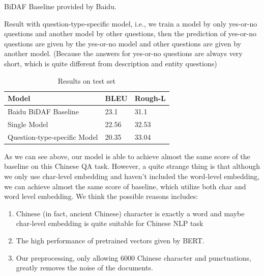\documentclass{article}
\begin{document}
BiDAF Baseline provided by Baidu.\citet{DBLP:journals/corr/abs-1711-05073}

Result with question-type-specific model, i.e., we train a model by only yes-or-no questions and another model by other questions, then the prediction of yes-or-no questions are given by the yes-or-no model and other questions are given by another model. (Because the answers for yes-or-no questions are always very short, which is quite different from description and entity questions)

\begin{table}
	\caption{Results on test set}
	\label{result-table}
	\centering
	\begin{tabular}{lll}
		\toprule
		  Model   &  BLEU    & Rough-L \\
		\midrule
		Baidu BiDAF Baseline & 23.1 & 31.1     \\
		Single Model     & 22.56 & 32.53      \\
		Question-type-specific Model     & 20.35 & 33.04  \\
		\bottomrule
	\end{tabular}
\end{table}

As we can see above, our model is able to achieve almost the same score of the baseline on this Chinese QA task. However, a quite strange thing is that although we only use char-level embedding and haven't included the word-level embedding, we can achieve almost the same score of baseline, which utilize both char and word level embedding. We think the possible reasons includes:
\begin{enumerate}
	\item Chinese (in fact, ancient Chinese) character is exactly a word and maybe char-level embedding is quite suitable for Chinese NLP task
	\item The high performance of pretrained vectors given by BERT.
	\item Our preprocessing, only allowing 6000 Chinese character and punctuations, greatly removes the noise of the documents.
\end{enumerate}



\end{document}
